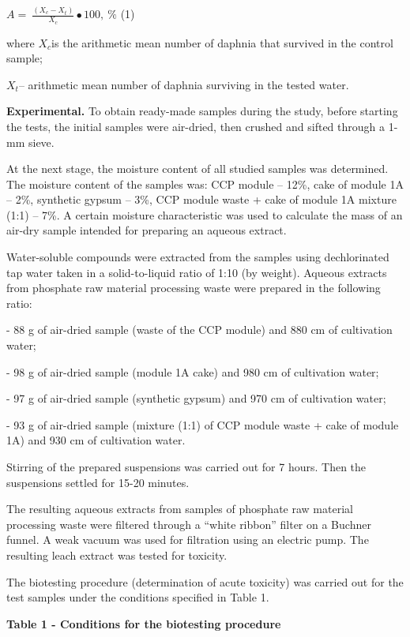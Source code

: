 \(A = \ \frac{(X_{c} - X_{t})}{X_{c}} \bullet 100,\ \%\) (1)

where \(X_{c}\)is the arithmetic mean number of daphnia that survived in
the control sample;

\(X_{t}\)-- arithmetic mean number of daphnia surviving in the tested
water.

{\bfseries Experimental.} To obtain ready-made samples during the study,
before starting the tests, the initial samples were air-dried, then
crushed and sifted through a 1-mm sieve.

At the next stage, the moisture content of all studied samples was
determined. The moisture content of the samples was: CCP module -- 12\%,
cake of module 1A -- 2\%, synthetic gypsum -- 3\%, CCP module waste +
cake of module 1A mixture (1:1) -- 7\%. A certain moisture
characteristic was used to calculate the mass of an air-dry sample
intended for preparing an aqueous extract.

Water-soluble compounds were extracted from the samples using
dechlorinated tap water taken in a solid-to-liquid ratio of 1:10 (by
weight). Aqueous extracts from phosphate raw material processing waste
were prepared in the following ratio:

- 88 g of air-dried sample (waste of the CCP module) and 880
cm of cultivation water;

- 98 g of air-dried sample (module 1A cake) and 980
cm of cultivation water;

- 97 g of air-dried sample (synthetic gypsum) and 970
cm of cultivation water;

- 93 g of air-dried sample (mixture (1:1) of CCP module waste + cake of
module 1A) and 930 cm of cultivation water.

Stirring of the prepared suspensions was carried out for 7 hours. Then
the suspensions settled for 15-20 minutes.

The resulting aqueous extracts from samples of phosphate raw material
processing waste were filtered through a ``white ribbon'' filter on a
Buchner funnel. A weak vacuum was used for filtration using an electric
pump. The resulting leach extract was tested for toxicity.

The biotesting procedure (determination of acute toxicity) was carried
out for the test samples under the conditions specified in Table 1.

{\bfseries Table 1 - Conditions for the biotesting procedure}

